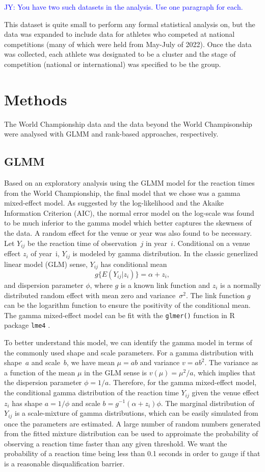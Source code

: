 \documentclass[12pt, letterpaper, titlepage]{article}
\newcommand{\jy}[1]{\textcolor{blue}{JY: #1}}
\begin{document}
\jy{You have two such datasets in the analysis. Use one paragraph for each.}

This dataset is quite small to perform any formal statistical analysis on, but
the data was expanded to include data for athletes who competed at national
competitions (many of which were held from May-July of 2022).  Once the data
was collected, each athlete was designated to be a cluster and the stage of
competition (national or international) was specified to be the group. 

\section{Methods} \label{sec:Methods}

The World Championship data and the data beyond the World Champisonship were
analysed with GLMM and rank-based approaches, respectively.

\subsection{GLMM}
Based on an exploratory analysis using the GLMM model for the reaction times
from the World Championship, the final model that we chose was a gamma
mixed-effect model. As suggested by the log-likelihood and the Akaike Information
Criterion (AIC), the normal error model on the log-scale was found to be
much inferior to the gamma model which better captures the skewness of the
data. A random effect for the venue or year was also found to be necessary.
Let $Y_{ij}$ be the reaction time of observation~$j$ in year~$i$.
Conditional on a venue effect $z_i$ of year~i,  $Y_{ij}$ is modeled by 
gamma distribution. In the classic generlized linear model (GLM) sense,
$Y_{ij}$ has conditional mean
\[
g\{E(Y_{ij} | z_i)\} = \alpha + z_i,
\]
and dispersion parameter $\phi$, where $g$ is a known link function and
$z_i$ is a normally distributed random effect with mean zero and
variance~$\sigma^2$. The link function $g$ can be the logarithm function to
ensure the positivity of the conditional mean.
The gamma mixed-effect model can be fit with the \texttt{glmer()} function in R
package \texttt{lme4} \citep{lme4}.


To better understand this model, we can identify the gamma model in terms of the
commonly used shape and scale parameters. For a gamma distribution with
shape~$a$ and scale~$b$, we have mean $\mu = ab$ and variance $v = ab^2$. The
variance as a function of the mean $\mu$ in the GLM sense is
$v(\mu) = \mu^2 / a$, which implies that the dispersion parameter
$\phi = 1 / a$. Therefore, for the gamma mixed-effect model, the conditional
gamma distribution of the reaction time $Y_{ij}$ given the venue effect $z_i$
has shape $a = 1 / \phi$ and scale $b = g^{-1}(\alpha + z_i) \phi$. The marginal
distribution of $Y_{ij}$ is a scale-mixture of gamma distributions, which can be
easily simulated from once the parameters are estimated. A large number of
random numbers generated from the fitted mixture distribution can be used to
approimate the probability of observing a reaction time faster than any given
threshold.  We want the probability of a reaction time being less than 0.1
seconds in order to gauge if that is a reasonable disqualification barrier.
\end{document}
